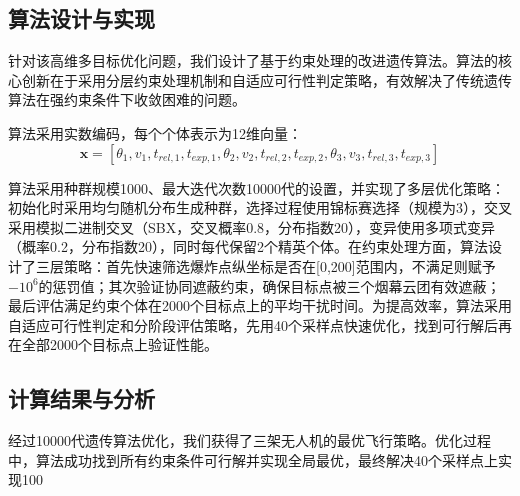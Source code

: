 \subsection{算法设计与实现}

针对该高维多目标优化问题，我们设计了基于约束处理的改进遗传算法。算法的核心创新在于采用分层约束处理机制和自适应可行性判定策略，有效解决了传统遗传算法在强约束条件下收敛困难的问题。

算法采用实数编码，每个个体表示为12维向量：
\[
\mathbf{x} = [\theta_1, v_1, t_{rel,1}, t_{exp,1}, \theta_2, v_2, t_{rel,2}, t_{exp,2}, \theta_3, v_3, t_{rel,3}, t_{exp,3}]
\]

算法采用种群规模1000、最大迭代次数10000代的设置，并实现了多层优化策略：初始化时采用均匀随机分布生成种群，选择过程使用锦标赛选择（规模为3），交叉采用模拟二进制交叉（SBX，交叉概率0.8，分布指数20），变异使用多项式变异（概率0.2，分布指数20），同时每代保留2个精英个体。在约束处理方面，算法设计了三层策略：首先快速筛选爆炸点纵坐标是否在[0,200]范围内，不满足则赋予$-10^6$的惩罚值；其次验证协同遮蔽约束，确保目标点被三个烟幕云团有效遮蔽；最后评估满足约束个体在2000个目标点上的平均干扰时间。为提高效率，算法采用自适应可行性判定和分阶段评估策略，先用40个采样点快速优化，找到可行解后再在全部2000个目标点上验证性能。

\subsection{计算结果与分析}

经过10000代遗传算法优化，我们获得了三架无人机的最优飞行策略。优化过程中，算法成功找到所有约束条件可行解并实现全局最优，最终解决40个采样点上实现100%

